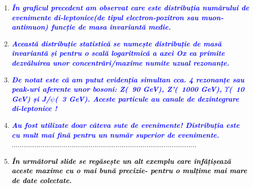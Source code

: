 \documentclass{beamer}
\begin{document}
\begin{frame}{}

\vspace{0cm}
\begin{enumerate}
  \small
  \item \makebox[0.5cm ]{} \textbf{\textit{ \textcolor{blue}{În graficul precedent am observat care este distribuția numărului de evenimente di-leptonice(de tipul electron-pozitron sau muon-antimuon) funcție de masa invariantă medie. }}}\\
 
  \item \makebox[0.5cm]{} \textit{\textbf{\textcolor{blue}{Această distribuție statistică se numește distribuție de masă invariantă și pentru o scală logaritmică a axei Ox ea primite dezvăluirea unor concentrări/maxime numite uzual rezonanțe.}}}\\

  \item \makebox[0.5cm]{} \textit{\textbf{\textcolor{blue}{De notat este că am putut evidenția simultan cca. 4 rezonanțe sau peak-uri aferente unor bosoni: 
  Z(~90 GeV), Z’(~1000 GeV), $\Upsilon$(~10 GeV) și J/$\psi$(~3 GeV). Aceste particule au canale de dezintegrare di-leptonice !}}}\\

  \item \makebox[0.5cm]{} \textit{\textbf{\textcolor{blue}{Au fost utilizate doar câteva sute de evenimente! Distribuția este cu mult mai fină pentru un număr superior de evenimente. }}}\\
   ................................................................................................
  \item \makebox[0.5cm]{} \textit{\textbf{\textcolor{black}{În următorul slide se regăsește un alt exemplu care înfățișează aceste maxime cu o mai bună precizie- pentru o mulțime mai mare de date colectate. }}}\\

\end{enumerate}

\end{frame} 
\end{document}
